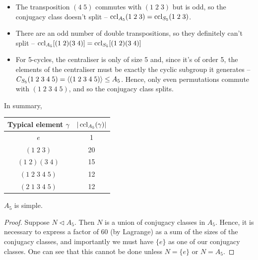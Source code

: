 \documentclass{../../template/note}
\begin{document}
    \begin{example}[Conjugacy in \(A_5\)]
        \begin{itemize}
            \item The transposition \((4 \; 5)\) commutes with \((1 \; 2 \; 3)\) but is odd, so the conjugacy class doesn't split -- \(\operatorname{ccl}_{A_5}(1 \; 2 \; 3) = \operatorname{ccl}_{S_5}(1 \; 2 \; 3)\).
            \item There are an odd number of double transpositions, so they definitely can't split -- \(\operatorname{ccl}_{A_5}[(1 \; 2)(3 \; 4)] = \operatorname{ccl}_{S_5}[(1 \; 2)(3 \; 4)]\)
            \item For 5-cycles, the centraliser is only of size 5 and, since it's of order 5, the elements of the centraliser must be exactly the cyclic subgroup it generates -- \(C_{S_5}(1 \; 2 \; 3 \; 4 \; 5) = \left \langle (1 \; 2 \; 3 \; 4 \; 5) \right \rangle \leq A_5\). Hence, only even permutations commute with \((1 \; 2 \; 3 \; 4 \; 5)\), and so the conjugacy class splits.
        \end{itemize} \vspace{10pt}
        In summary,
        \begin{center}
            \begin{tabular}{c | c}
                Typical element \(\gamma\) & \(|\operatorname{ccl}_{A_5}(\gamma)|\) \\
                \hline
                \(e\) & 1 \\
                \((1 \; 2 \; 3)\) & 20 \\
                \((1 \; 2)(3 \; 4)\) & 15 \\
                \((1 \; 2 \; 3 \; 4 \; 5)\) & 12 \\
                \((2 \; 1 \; 3 \; 4 \; 5)\) & 12
            \end{tabular}
        \end{center}
    \end{example}
    
    \begin{theorem}[\(A_5\) is simple]
        \(A_5\) is simple.
    \end{theorem}
    
    \begin{proof}
        Suppose \(N \triangleleft A_5\). Then \(N\) is a union of conjugacy classes in \(A_5\). Hence, it is necessary to express a factor of 60 (by Lagrange) as a sum of the sizes of the conjugacy classes, and importantly we must have \(\{e\}\) as one of our conjugacy classes. One can see that this cannot be done unless \(N = \{e\}\) or \(N = A_5\).
    \end{proof}
    
\end{document}
